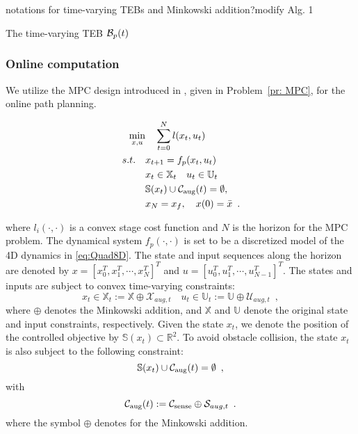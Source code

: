 \color{blue} notations for time-varying TEBs and Minkowski addition?modify Alg. 1\color{black}

The time-varying TEB $\mathcal B_p(t)$ 


\subsubsection{Online computation}
%
We utilize the MPC design introduced in \cite{zhang_2017_MPC}, given in Problem~\ref{pr: MPC}, for the online path planning.
%
\begin{problem}\label{pr:MPC}
\begin{align*}
\min_{x,u}  & \quad \sum^{N}_{t=0} l(x_t,u_t)  \\
s.t. \quad &x_{t+1} = f_p(x_t,u_t)\\
& x_t \in \mathbb{X}_t\quad u_t \in \mathbb{U}_t\\
& \mathbb{S}(x_t)\cup\mathcal C_\text{aug}(t) = \emptyset,\\
& x_N = x_f ,\quad x(0) = \bar{x} \enspace.
\end{align*}
\end{problem}
\noindent where $l_i(\cdot,\cdot)$ is a  convex stage cost function and $N$ is the horizon for the MPC problem. The dynamical system $f_p(\cdot,\cdot)$ is set to be a discretized model of the 4D dynamics in \ref{eq:Quad8D}. The state and input sequences along the horizon  are denoted by $x=[x^{T}_0,x^{T}_1,\cdots,x^{T}_N]^{T}$ and $u=[u^{T}_0,u^{T}_1,\cdots,u^{T}_{N-1}]^{T}$. The states and inputs are subject to convex time-varying constraints:
%
\begin{equation}
x_t \in \mathbb{X}_t :=\mathbb{X}\oplus\mathcal{X}_{aug,t} \quad u_t \in\mathbb{U}_t := \mathbb{U}\oplus\mathcal{U}_{aug,t} \enspace ,
\end{equation}
%
where $\oplus$ denotes the Minkowski addition, and $\mathbb{X}$ and $\mathbb{U}$ denote the original state and input constraints, respectively. Given the state $x_t$, we denote the position of the controlled objective by $\mathbb{S}(x_t)\subset \mathbb{R}^{2}$. To avoid obstacle collision, the state $x_t$ is also subject to the following constraint: 
%
\begin{equation}
\mathbb{S}(x_t)\cup\mathcal C_\text{aug}(t) = \emptyset \enspace ,
\end{equation}
%
with 
%
\begin{equation}
\mathcal C_\text{aug}(t) := \mathcal C_\text{sense}\oplus\mathcal{S}_{aug,t} \enspace .
\end{equation}
%
where the symbol $\oplus$ denotes for the Minkowski addition.
